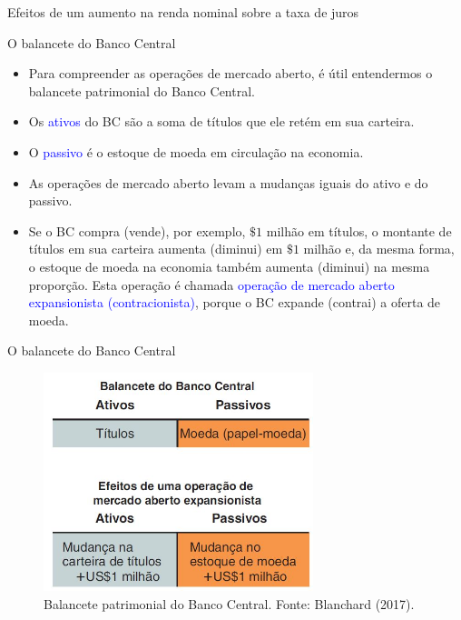 \documentclass[10pt]{beamer}
\begin{document}
\begin{frame}{Efeitos de um aumento na renda nominal sobre a taxa de juros}
\begin{frame}{O balancete do Banco Central}
    \begin{itemize}
        \item Para compreender as operações de mercado aberto, é útil entendermos o balancete patrimonial do Banco Central.
        \bigskip
        \item Os \textcolor{blue}{ativos} do BC são a soma de títulos que ele retém em sua carteira.
        \bigskip
        \item O \textcolor{blue}{passivo} é o estoque de moeda em circulação na economia.
        \bigskip
        \item As operações de mercado aberto levam a mudanças iguais do ativo e do passivo.
        \bigskip
        \item Se o BC compra (vende), por exemplo, $\$ 1$ milhão em títulos, o montante de títulos em sua carteira aumenta (diminui) em $\$ 1$ milhão e, da mesma forma, o estoque de moeda na economia também aumenta (diminui) na mesma proporção. Esta operação é chamada \textcolor{blue}{operação de mercado aberto expansionista (contracionista)}, porque o BC expande (contrai) a oferta de moeda.
    \end{itemize}
\end{frame}

\begin{frame}{O balancete do Banco Central}
\begin{figure}
    \centering
    \includegraphics[width=0.7\textwidth]{./figures/aula072_fig5.JPG}
    \caption{Balancete patrimonial do Banco Central. Fonte: Blanchard (2017).}
    \label{fig5}
\end{figure}
\end{frame}


\end{frame}
\end{document}
